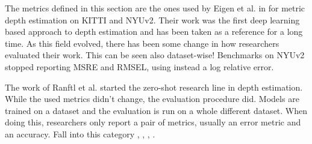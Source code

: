 \vspace{0.5cm}

The metrics defined in this section are the ones used by Eigen et al. in \cite{Eigen} for metric depth estimation on KITTI and NYUv2.
Their work was the first deep learning based approach to depth estimation and has been taken as a reference for a long time.
As this field evolved, there has been some change in how researchers evaluated their work.
This can be seen also dataset-wise!
Benchmarks on NYUv2 stopped reporting MSRE and RMSEL, using instead a log relative error.

The work of Ranftl et al. \cite{MiDas} started the zero-shot research line in depth estimation.
While the used metrics didn't change, the evaluation procedure did.
Models are trained on a dataset and the evaluation is run on a whole different dataset.
When doing this, researchers only report a pair of metrics, usually an error metric and an accuracy.
Fall into this category \cite{MiDas}, \cite{PatchFusion}, \cite{Marigold}, \cite{ZoeDepth}.

